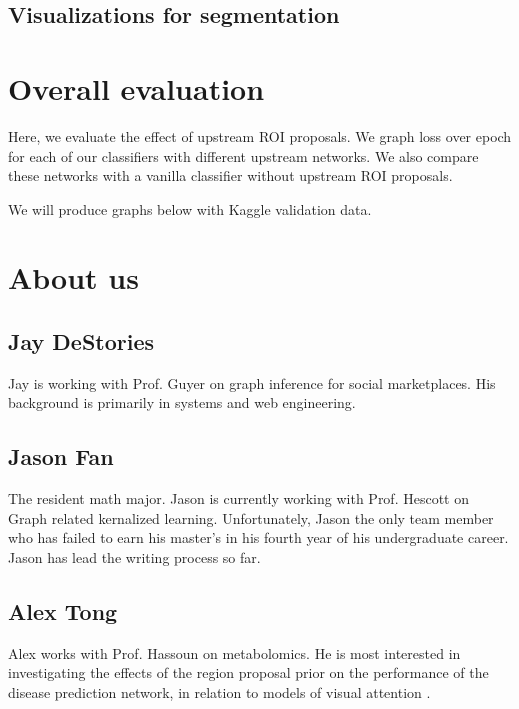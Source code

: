 \documentclass[twocolumn,10pt]{article}
\begin{document}

\subsection{Visualizations for segmentation}



\section{Overall evaluation}

Here, we evaluate the effect of upstream ROI proposals. We graph loss over
epoch for each of our classifiers with different upstream networks. We also
compare these networks with a vanilla classifier without upstream ROI proposals.

We will produce graphs below with Kaggle validation data.


\section{About us}
\subsection{Jay DeStories}
Jay is working with Prof. Guyer on graph inference for social
marketplaces. His background is primarily in systems and web engineering.

\subsection{Jason Fan}
The resident math major. Jason is currently working with Prof. Hescott on Graph
related kernalized learning. Unfortunately, Jason the only team member 
who has failed to earn his master's in his fourth year of his undergraduate career.
Jason has lead the writing process so far.

\subsection{Alex Tong}
Alex works with Prof. Hassoun on metabolomics. He is most interested in 
investigating the effects of the region proposal prior on the performance of
the disease prediction network, in relation to models of visual attention \cite{NIPS2014_5542}. 
\end{document}
